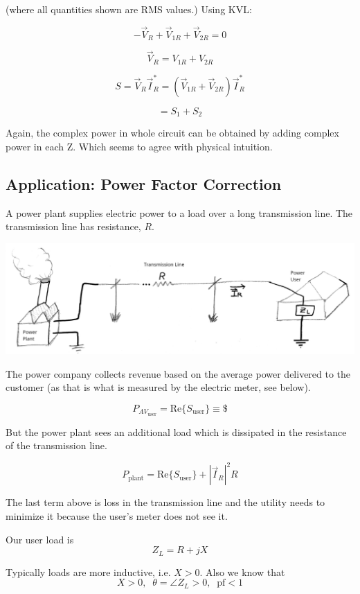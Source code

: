 (where all quantities shown are RMS values.)
Using KVL:

\[
-\vec{V}_R + \vec{V}_{1R} + \vec{V}_{2R} = 0
\]

\[
 \vec{V}_R = V_{1R} + V_{2R}
\]

\[
S = \vec{V}_R \vec{I}_R^* = (\vec{V}_{1R} + \vec{V}_{2R}) \vec{I}_R^*
\]

\[
= S_1 + S_2
\]

Again, the complex power in whole circuit can be obtained by
adding complex power in each Z.  Which seems to agree with physical
intuition.




\subsection{Application: Power Factor Correction}

A power plant supplies electric power to a load over a long transmission line.
The transmission line has resistance, $R$.

\includegraphics[width=\textwidth]{figsChapt03/BN97423.png}


The power company collects revenue based on the average power delivered
to the customer (as that is what is measured by the electric meter, see below).


\[
P_{AV_{\text{user}}} = \text{Re}\{S_{\text{user}}\} \equiv  \$
\]

But the power plant sees an additional load which is dissipated in the
resistance of the transmission line.


\[
P_{\text{plant}} = \text{Re}\{S_{\text{user}}\} + |\vec{I}_R|^2 R
\]


The last term above is loss in the transmission line and the utility needs
 to minimize it because the user's meter does not see it.

Our user load is
\[
Z_L = R + jX
\]

Typically loads are more inductive, i.e. $X>0$.  Also we know that
\[
X>0,\;\; \theta = \angle Z_L > 0, \;\; \text{pf} < 1
\]

